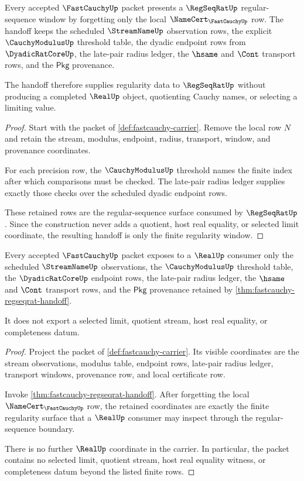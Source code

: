 \begin{theorem}
\label{thm:fastcauchy-regseqrat-handoff}
Every accepted $\FastCauchyUp$ packet presents a $\RegSeqRatUp$ regular-sequence window by forgetting only the local $\NameCert_{\FastCauchyUp}$ row. The handoff keeps the scheduled $\StreamNameUp$ observation rows, the explicit $\CauchyModulusUp$ threshold table, the dyadic endpoint rows from $\DyadicRatCoreUp$, the late-pair radius ledger, the $\hsame$ and $\Cont$ transport rows, and the $\mathsf{Pkg}$ provenance.

The handoff therefore supplies regularity data to $\RegSeqRatUp$ without producing a completed $\RealUp$ object, quotienting Cauchy names, or selecting a limiting value.
\end{theorem}
\begin{proof}
Start with the packet of \autoref{def:fastcauchy-carrier}. Remove the local row $N$ and retain the stream, modulus, endpoint, radius, transport, window, and provenance coordinates.

For each precision row, the $\CauchyModulusUp$ threshold names the finite index after which comparisons must be checked. The late-pair radius ledger supplies exactly those checks over the scheduled dyadic endpoint rows.

These retained rows are the regular-sequence surface consumed by $\RegSeqRatUp$. Since the construction never adds a quotient, host real equality, or selected limit coordinate, the resulting handoff is only the finite regularity window.
\end{proof}

\begin{theorem}
\label{thm:fastcauchy-real-boundary-window}
Every accepted $\FastCauchyUp$ packet exposes to a $\RealUp$ consumer only the scheduled $\StreamNameUp$ observations, the $\CauchyModulusUp$ threshold table, the $\DyadicRatCoreUp$ endpoint rows, the late-pair radius ledger, the $\hsame$ and $\Cont$ transport rows, and the $\mathsf{Pkg}$ provenance retained by \autoref{thm:fastcauchy-regseqrat-handoff}.

It does not export a selected limit, quotient stream, host real equality, or completeness datum.
\end{theorem}
\begin{proof}
Project the packet of \autoref{def:fastcauchy-carrier}. Its visible coordinates are the stream observations, modulus table, endpoint rows, late-pair radius ledger, transport windows, provenance row, and local certificate row.

Invoke \autoref{thm:fastcauchy-regseqrat-handoff}. After forgetting the local $\NameCert_{\FastCauchyUp}$ row, the retained coordinates are exactly the finite regularity surface that a $\RealUp$ consumer may inspect through the regular-sequence boundary.

There is no further $\RealUp$ coordinate in the carrier. In particular, the packet contains no selected limit, quotient stream, host real equality witness, or completeness datum beyond the listed finite rows.
\end{proof}

